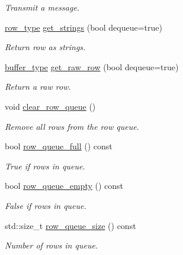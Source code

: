 \begin{DoxyCompactItemize}
\begin{DoxyCompactList}\small\item\em Transmit a message. \end{DoxyCompactList}\item 
\hyperlink{classsession_ae75ba42ea21ef0fabffb963ca7e36380}{row\+\_\+type} \hyperlink{classsession_a1f9bd2fa3a65f315c20b39a7b3c006bb}{get\+\_\+strings} (bool dequeue=true)
\begin{DoxyCompactList}\small\item\em Return row as strings. \end{DoxyCompactList}\item 
\hyperlink{classsession_a6d23252848c7fc9419e4bf318d57b43d}{buffer\+\_\+type} \hyperlink{classsession_ab16f4a42b8f6c3535a28316548ba4955}{get\+\_\+raw\+\_\+row} (bool dequeue=true)
\begin{DoxyCompactList}\small\item\em Return a raw row. \end{DoxyCompactList}\item 
\mbox{\label{classsession_aacd880063724c806469d2578b4bfab5b}} 
void \hyperlink{classsession_aacd880063724c806469d2578b4bfab5b}{clear\+\_\+row\+\_\+queue} ()
\begin{DoxyCompactList}\small\item\em Remove all rows from the row queue. \end{DoxyCompactList}\item 
bool \hyperlink{classsession_ab3f9dd34138fa63e19d2e95bb50741d0}{row\+\_\+queue\+\_\+full} () const
\begin{DoxyCompactList}\small\item\em True if rows in queue. \end{DoxyCompactList}\item 
bool \hyperlink{classsession_a02fc3cd2b93c9ef779d17060bb2f08a0}{row\+\_\+queue\+\_\+empty} () const
\begin{DoxyCompactList}\small\item\em False if rows in queue. \end{DoxyCompactList}\item 
std\+::size\+\_\+t \hyperlink{classsession_ab1519e6ca9a36bdee16c4765828d345e}{row\+\_\+queue\+\_\+size} () const
\begin{DoxyCompactList}\small\item\em Number of rows in queue. \end{DoxyCompactList}\item 

\end{DoxyCompactItemize}

